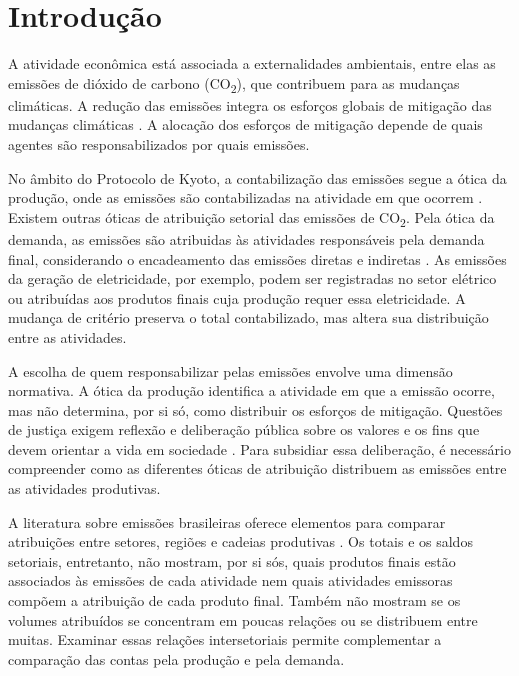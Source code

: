 \section{Introdução}

A atividade econômica está associada a externalidades ambientais, entre elas as emissões de dióxido de carbono (CO\textsubscript{2}), que contribuem para as mudanças climáticas. A redução das emissões integra os esforços globais de mitigação das mudanças climáticas \parencite{ipcc2023spm}. A alocação dos esforços de mitigação depende de quais agentes são responsabilizados por quais emissões. 

No âmbito do Protocolo de Kyoto, a contabilização das emissões segue a ótica da produção, onde as emissões são contabilizadas na atividade em que ocorrem \parencite{unfccc2008kyotoManual}. Existem outras óticas de atribuição setorial das emissões de CO\textsubscript{2}. Pela ótica da demanda, as emissões são atribuidas às atividades responsáveis pela demanda final, considerando o encadeamento das emissões diretas e indiretas \parencite{marques2012,millerBlair2009}. As emissões da geração de eletricidade, por exemplo, podem ser registradas no setor elétrico ou atribuídas aos produtos finais cuja produção requer essa eletricidade. A mudança de critério preserva o total contabilizado, mas altera sua distribuição entre as atividades.

A escolha de quem responsabilizar pelas emissões envolve uma dimensão normativa. A ótica da produção identifica a atividade em que a emissão ocorre, mas não determina, por si só, como distribuir os esforços de mitigação. Questões de justiça exigem reflexão e deliberação pública sobre os valores e os fins que devem orientar a vida em sociedade \parencite{sandel2015justica}. Para subsidiar essa deliberação, é necessário compreender como as diferentes óticas de atribuição distribuem as emissões entre as atividades produtivas.

A literatura sobre emissões brasileiras oferece elementos para comparar atribuições entre setores, regiões e cadeias produtivas \parencite{imori2015,sanguinetAzzoni2024,montoyaEtAl2026}. Os totais e os saldos setoriais, entretanto, não mostram, por si sós, quais produtos finais estão associados às emissões de cada atividade nem quais atividades emissoras compõem a atribuição de cada produto final. Também não mostram se os volumes atribuídos se concentram em poucas relações ou se distribuem entre muitas. Examinar essas relações intersetoriais permite complementar a comparação das contas pela produção e pela demanda.

